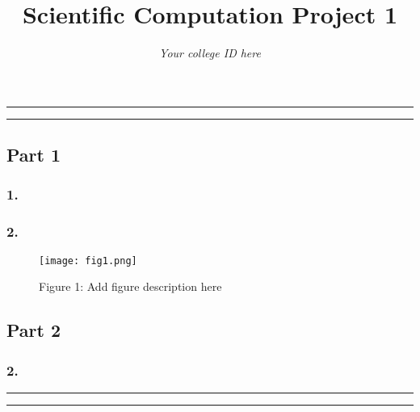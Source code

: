 \documentclass{article}
\title{Scientific Computation Project 1}
\author{\emph{Your college ID here}}
\begin{document}
\maketitle

\hrule
\hrule

\subsection*{Part 1}


\subsubsection*{1.}



\subsubsection*{2.}


\begin{figure}[h!]
\centering
\texttt{[image: fig1.png]}

\caption{Figure 1: Add figure description here}
\label{fig1}
\end{figure}





\vspace{0.25in}

\subsection*{Part 2}

\subsubsection*{2.}



\hrule
\hrule



\end{document}
